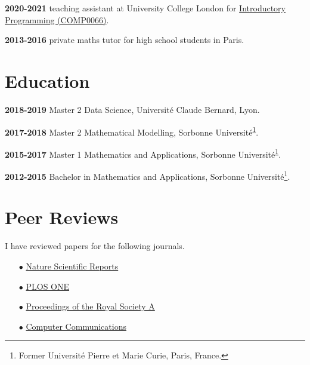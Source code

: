\documentclass[a4paper,10pt]{article}
\begin{document}
\textbf{2020-2021} teaching assistant at University College London for \href{https://www.ucl.ac.uk/module-catalogue/modules/introductory-programming/COMP0066}{Introductory Programming (COMP0066)}.

\textbf{2013-2016} private maths tutor for high school students in Paris.

\section*{Education}
\textbf{2018-2019} Master 2 Data Science, Université Claude Bernard, Lyon.

\textbf{2017-2018} Master 2 Mathematical Modelling, Sorbonne Université\textsuperscript{\ref{note1}}.

\textbf{2015-2017} Master 1 Mathematics and Applications, Sorbonne Université\textsuperscript{\ref{note1}}.

\textbf{2012-2015} Bachelor in Mathematics and Applications, Sorbonne Université\footnote{\label{note1}Former Université Pierre et Marie Curie, Paris, France.}.


\section*{Peer Reviews}
I have reviewed papers for the following journals.
\begin{itemize}
	\item[$\bullet$] \href{https://www.nature.com/srep/}{Nature Scientific Reports}
	\item[$\bullet$] \href{https://journals.plos.org/plosone/}{PLOS ONE}
	\item[$\bullet$] \href{https://royalsocietypublishing.org/journal/rspa}{Proceedings of the Royal Society A}
	\item[$\bullet$] \href{https://www.journals.elsevier.com/computer-communications}{Computer Communications}
\end{itemize}

 \thispagestyle{empty} %
\end{document}
